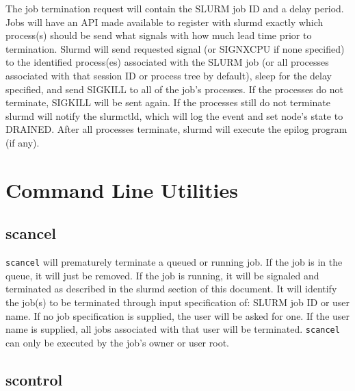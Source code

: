
The job termination request will contain the SLURM job ID 
and a delay period. 
Jobs will have an API made available to register with 
slurmd exactly which process(s) should be send what 
signals with how much lead time prior to termination. 
Slurmd will send requested signal (or SIGNXCPU if none 
specified) to the identified process(es) associated 
with the SLURM job (or all processes associated with 
that session ID or process tree by default), sleep for the 
delay specified, and send SIGKILL to all of the job's processes. 
If the processes do not terminate, SIGKILL will be sent 
again. 
If the processes still do not terminate slurmd will notify 
the slurmctld, which will log the event and set node's 
state to DRAINED. 
After all processes terminate, slurmd will execute the epilog 
program (if any). 

\section{Command Line Utilities}

\subsection{scancel}

{\tt scancel} will prematurely terminate a queued or running job. 
If the job is in the queue, it will just be removed. 
If the job is running, it will be signaled and terminated 
as described in the slurmd section of this document. 
It will identify the job(s) to be terminated through input 
specification of: SLURM job ID or user name.
If no job specification is supplied, the user will be asked for one.
If the user name is supplied, all jobs associated with that user 
will be terminated.
{\tt scancel} can only be executed by the job's owner or user root. 

\subsection{scontrol}

